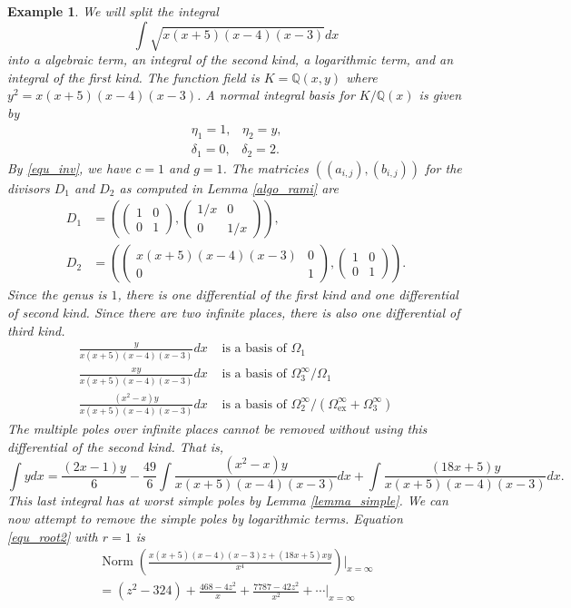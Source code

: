 \documentclass[12pt,reqno]{amsart}
\numberwithin{equation}{section}
\newtheorem{example}[theorem]{Example}
\newcommand{\mat}[4]  { \left(\begin{array}{cc} #1 & #2 \\ #3 & #4 \end{array} \right)}
\newcommand{\op}[1]  { \operatorname{ #1 }}
\newcommand{\bbQ}[0]  { \mathbb{Q}}
\begin{document}
\begin{example}
\label{ex_el4}
We will split the integral
\begin{equation*}
 \int \sqrt{x (x+5)(x-4)(x-3)} dx
\end{equation*}
into a algebraic term, an integral of the second kind, a logarithmic term, and an integral of the first kind. The function field is $K=\mathbb{Q}(x,y)$ where $y^2 = x (x+5)(x-4)(x-3)$. A normal integral basis for $K/\bbQ(x)$ is given by
\begin{gather*}
 \eta_1=1\text{,} \quad \eta_2=y\text{,}\\
 \delta_1=0\text{,} \quad \delta_2=2\text{.}
\end{gather*}
By \eqref{equ_inv}, we have $c=1$ and $g=1$. The matricies $((a_{i,j}), (b_{i,j}))$ for the divisors $D_1$ and $D_2$ as computed in Lemma \ref{algo_rami} are
\begin{align*}
 D_1 &= \left( \mat{1}{0}{0}{1}, \mat{1/x}{0}{0}{1/x} \right)\text{,}\\
 D_2 &= \left( \mat{x (x+5)(x-4)(x-3)}{0}{0}{1}, \mat{1}{0}{0}{1} \right)\text{.}
\end{align*}
Since the genus is $1$, there is one differential of the first kind and one differential of second kind. Since there are two infinite places, there is also one differential of third kind.
\begin{align*}
 \frac{y}{x (x+5)(x-4) (x-3)} dx &\text{ is a basis of } \Omega_1\\
 \frac{xy}{x(x+5)(x-4) (x-3)} dx &\text{ is a basis of } \Omega_3^{\infty}/\Omega_1\\
 \frac{(x^2-x)y}{x (x+5)(x-4)(x-3)} dx &\text{ is a basis of } \Omega_2^{\infty}/(\Omega_{\op{ex}}^{\infty}+\Omega_3^{\infty})
\end{align*}
The multiple poles over infinite places cannot be removed without using this differential of the second kind. That is,
\begin{equation*}
 \int y dx = \frac{(2x-1)y}{6} -\frac{49}{6} \int \frac{(x^2-x)y}{x (x+5)(x-4)(x-3)} dx + \int \frac{(18x+5)y}{x (x+5)(x-4)(x-3)} dx\text{.}
\end{equation*}
This last integral has at worst simple poles by Lemma \ref{lemma_simple}. We can now attempt to remove the simple poles by logarithmic terms. Equation \eqref{equ_root2} with $r=1$ is
\begin{gather*}
 \op{Norm} \left( \frac{x(x+5)(x-4)(x-3)z+(18x+5)x y}{x^4} \right) \Big|_{x=\infty}\\
= \left(z^2-324\right)+\frac{468-4 z^2}{x}+\frac{7787-42 z^2}{x^2}+\cdots \Big|_{x=\infty}\\

\end{gather*}
\end{example}
\end{document}
